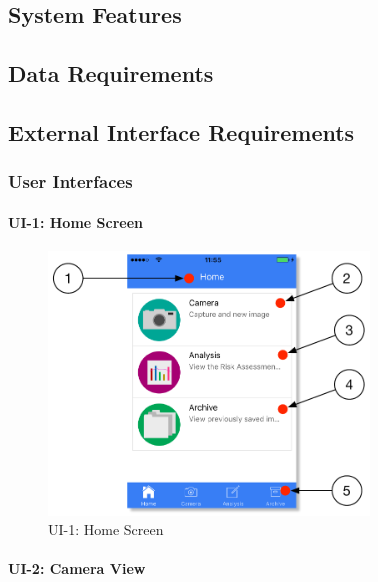     \subsection{System Features}
        

    \subsection{Data Requirements}
    

    \subsection{External Interface Requirements}
        \subsubsection{User Interfaces}
            \paragraph{UI-1: Home Screen}

                \begin{figure}[H]
                    \centering
                    \includegraphics[height=7cm]{assets/GUI/HOME_01.pdf}
                    \caption{UI-1: Home Screen}
                    \label{fig:ui-1}
                \end{figure}

            \paragraph{UI-2: Camera View}


